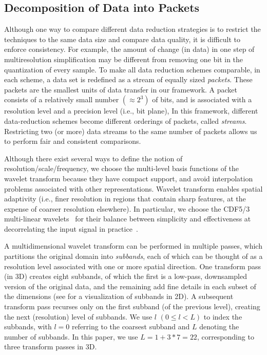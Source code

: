 \subsection{Decomposition of Data into Packets} \label{sec:data-streaming-framework}

Although one way to compare different data reduction strategies is to restrict the techniques to the
same data size and compare data quality, it is difficult to enforce consistency. For example, the
amount of change (in data) in one step of multiresolution simplification may be different from
removing one bit in the quantization of every sample. To make all data reduction schemes comparable,
in each scheme, a data set is redefined as a stream of equally sized \emph{packets}. These packets
are the smallest units of data transfer in our framework. A packet consists of a relatively small
number $\left(\approx 2^3\right)$ of bits, and is associated with a resolution level and a precision
level (i.e., bit plane), In this framework, different data-reduction schemes become different
orderings of packets, called \emph{streams}. Restricting two (or more) data streams to the same
number of packets allows us to perform fair and consistent comparisons.

Although there exist several ways to define the notion of resolution/scale/frequency, we choose the
multi-level basis functions of the wavelet transform because they have compact support, and avoid
interpolation problems associated with other representations. Wavelet transform enables spatial
adaptivity (i.e., finer resolution in regions that contain sharp features, at the expense of coarser
resolution elsewhere). In particular, we choose the CDF5/3 multi-linear wavelets~\cite{cdf-wavelets}
for their balance between simplicity and effectiveness at decorrelating the input signal in
practice~\cite{jpeg2000}.

A multidimensional wavelet transform can be performed in multiple passes, which partitions the
original domain into \emph{subbands}, each of which can be thought of as a resolution level
associated with one or more spatial direction. One transform pass (in 3D) creates eight subbands, of
which the first is a low-pass, downsampled version of the original data, and the remaining add fine
details in each subset of the dimensions (see  for a visualization of subbands in
2D). A subsequent transform pass recurses only on the first subband (of the previous level), creating the next (resolution)
level of subbands. We use $l$ $(0 \leq l < L)$ to index the subbands, with $l = 0$ referring to the
coarsest subband and $L$ denoting the number of subbands. In this paper, we use $L=1 + 3*7=22$,
corresponding to three transform passes in 3D.

